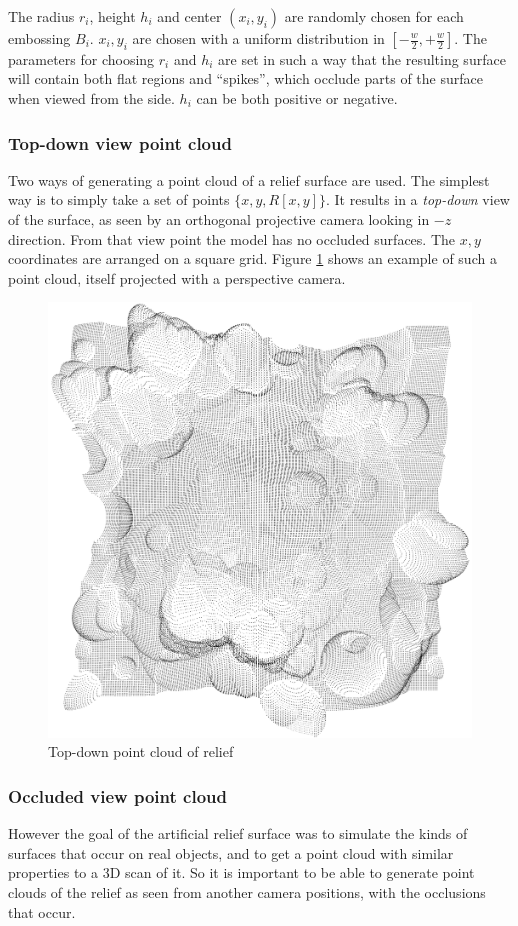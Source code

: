 The radius $r_i$, height $h_i$ and center $(x_i, y_i)$ are randomly chosen for each embossing $B_i$. $x_i, y_i$ are chosen with a uniform distribution in $[-\frac{w}{2}, +\frac{w}{2}]$. The parameters for choosing $r_i$ and $h_i$ are set in such a way that the resulting surface will contain both flat regions and ``spikes'', which occlude parts of the surface when viewed from the side. $h_i$ can be both positive or negative.

\subsubsection{Top-down view point cloud}
Two ways of generating a point cloud of a relief surface are used. The simplest way is to simply take a set of points $\{ x, y, R[x,y] \}$. It results in a \emph{top-down} view of the surface, as seen by an orthogonal projective camera looking in $-z$ direction. From that view point the model has no occluded surfaces. The $x, y$ coordinates are arranged on a square grid. Figure \ref{fig:relief_plain} shows an example of such a point cloud, itself projected with a perspective camera.

\begin{figure}[h]
\centering
\includegraphics[width=.5\textwidth]{fig/r1_plain.png}
\caption{Top-down point cloud of relief}
\label{fig:relief_plain}
\end{figure}

\subsubsection{Occluded view point cloud}
However the goal of the artificial relief surface was to simulate the kinds of surfaces that occur on real objects, and to get a point cloud with similar properties to a 3D scan of it. So it is important to be able to generate point clouds of the relief as seen from another camera positions, with the occlusions that occur.

